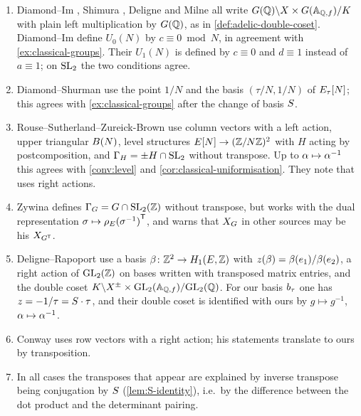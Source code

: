 \begin{remark}\label{rem:literature}
\begin{enumerate}
\item Diamond--Im \cite[\S 11.1, Rem.~11.1.1]{DiamondIm1995}, Shimura
  \cite{Shimura1971}, Deligne \cite{DeligneTravaux1971,DeligneVarietes1979}
  and Milne \cite{Milne2005} all write
  $G(\mathbb{Q})\backslash X \times G(\mathbb{A}_{\mathbb{Q},f})/K$ with plain left
  multiplication by $G(\mathbb{Q})$, as in \cref{def:adelic-double-coset}.
  Diamond--Im define $U_0(N)$ by $c \equiv 0 \bmod N$, in agreement with
  \cref{ex:classical-groups}. Their $U_1(N)$ is defined by $c \equiv 0$ and
  $d \equiv 1$ instead of $a \equiv 1$; on $\SL{2}{}$ the two conditions
  agree.
\item Diamond--Shurman \cite{DiamondShurman2005} use the point $1/N$ and
  the basis $(\tau/N, 1/N)$ of $E_{\tau}[N]$; this agrees
  with \cref{ex:classical-groups} after the change of basis $S$.
\item Rouse--Sutherland--Zureick-Brown \cite[\S 2]{RSZB2022} use column
  vectors with a left action, upper triangular $B(N)$, level
  structures $E[N] \to (\mathbb{Z}/N\mathbb{Z})^{2}$ with $H$
  acting by postcomposition, and $\GammaOfLevel{H} = \pm H \cap \SL{2}{}$
  without transpose. Up to $\alpha \mapsto \alpha^{-1}$
  this agrees with \cref{conv:level} and
  \cref{cor:classical-uniformisation}. They note that
  \cite{RouseZureickBrown2015} uses right actions.
\item Zywina \cite[Remark 3.6]{ZywinaExplicit2022} defines
  $\GammaOfLevel{G} = G \cap \SL{2}{\ZZ}$ without transpose, but works with
  the dual representation $\sigma \mapsto {\rho_E(\sigma^{-1})}^{\mathsf{T}}$,
  and warns that $X_{G}$ in other sources may be his
  $X_{{G}^{\mathsf{T}}}$.
\item Deligne--Rapoport \cite[IV.5.1--5.3]{DeligneRapoport1973} use a basis
  $\beta \colon \mathbb{Z}^{2} \to H_1(E,\mathbb{Z})$ with
  $z(\beta) = \beta(e_{1})/\beta(e_{2})$, a right action of
  $\GL{2}{\ZZ}$ on bases written with transposed matrix entries, and the
  double coset
  $K\backslash X^{\pm}\times\GL{2}{\FiniteAdeles{\QQ}}/\GL{2}{\QQ}$. For our
  basis $b_{\tau}$ one has $z = -1/\tau = S\cdot \tau$, and
  their double coset is identified with ours by $g \mapsto g^{-1}$,
  $\alpha \mapsto \alpha^{-1}$.
\item Conway \cite{Conway1996} uses row vectors with a right action; his
  statements translate to ours by transposition.
\item In all cases the transposes that appear are explained by
  inverse transpose being conjugation by $S$
  (\cref{lem:S-identity}), i.e.\ by the difference between the dot product
  and the determinant pairing.
\end{enumerate}
\end{remark}
